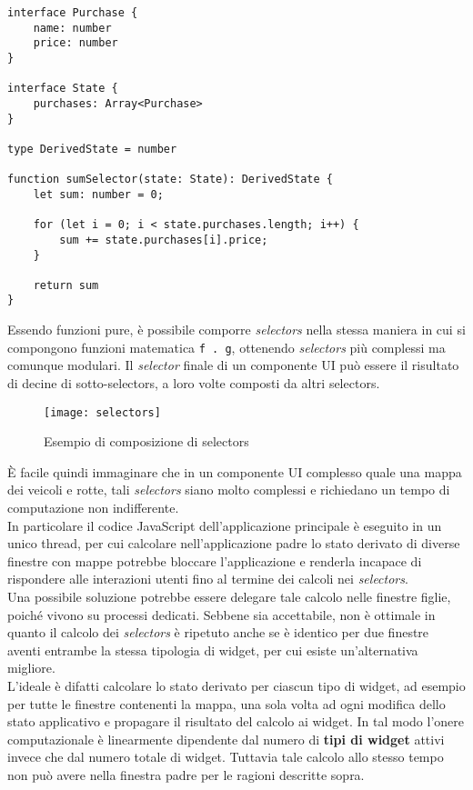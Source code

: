 \begin{lstlisting}[language={[Sharp]C}]
interface Purchase {
    name: number
    price: number
}

interface State {
    purchases: Array<Purchase>
}

type DerivedState = number

function sumSelector(state: State): DerivedState {
    let sum: number = 0;

    for (let i = 0; i < state.purchases.length; i++) {
        sum += state.purchases[i].price;
    }

    return sum
}
\end{lstlisting}

Essendo funzioni pure, è possibile comporre \textit{selectors} nella stessa maniera in cui si compongono funzioni matematica \texttt{f . g}, ottenendo \textit{selectors} più complessi ma comunque modulari. Il \textit{selector} finale di un componente UI può essere il risultato di decine di sotto-selectors, a loro volte composti da altri selectors.

\begin{figure}[H] 
  \centering 
  \texttt{[image: selectors]} 
  \caption{Esempio di composizione di selectors}
\end{figure}

È facile quindi immaginare che in un componente UI complesso quale una mappa dei veicoli e rotte, tali \textit{selectors} siano molto complessi e richiedano un tempo di computazione non indifferente. \\

In particolare il codice JavaScript dell'applicazione principale è eseguito in un unico thread, per cui calcolare nell'applicazione padre lo stato derivato di diverse finestre con mappe potrebbe bloccare l'applicazione e renderla incapace di rispondere alle interazioni utenti fino al termine dei calcoli nei \textit{selectors}. \\

Una possibile soluzione potrebbe essere delegare tale calcolo nelle finestre figlie, poiché vivono su processi dedicati. Sebbene sia accettabile, non è ottimale in quanto il calcolo dei \textit{selectors} è ripetuto anche se è identico per due finestre aventi entrambe la stessa tipologia di widget, per cui esiste un'alternativa migliore. \\

L'ideale è difatti calcolare lo stato derivato per ciascun tipo di widget, ad esempio per tutte le finestre contenenti la mappa, una sola volta ad ogni modifica dello stato applicativo e propagare il risultato del calcolo ai widget. In tal modo l'onere computazionale è linearmente dipendente dal numero di \textbf{tipi di widget} attivi invece che dal numero totale di widget. Tuttavia tale calcolo allo stesso tempo non può avere nella finestra padre per le ragioni descritte sopra.

